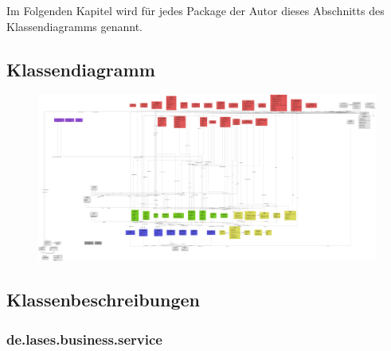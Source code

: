 
Im Folgenden Kapitel wird für jedes Package der Autor dieses Abschnitts des Klassendiagramms genannt.

\newcommand{\classtable}[1]{\begin{longtable}[H]{m{5cm}m{9cm}}
                                \hline
                                \textbf{Klassenname} & \textbf{Beschreibung} \\
                                \hline
                                \hline
                                #1
\end{longtable}
}

\newcommand{\classentry}[2]{\textbf{#1} & #2 \\
}

\subsection{Klassendiagramm}


\begin{figure}[H]
	\centering
	\includegraphics[width=\linewidth]{graphics/klassendiagramm_png}
\end{figure}


\subsection{Klassenbeschreibungen}

\subsubsection{de.lases.business.service}


